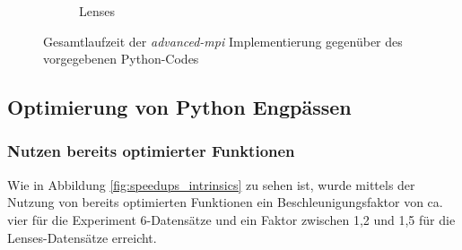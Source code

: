 \begin{center}
\begin{figure}[htbp]
\begin{subfigure}[b]{0.45\textwidth}
			\caption{Lenses}
			\label{fig:mpi_advanced_times_lenses}
		\end{subfigure}
		\caption{Gesamtlaufzeit der \textit{advanced-mpi} Implementierung gegenüber des vorgegebenen Python-Codes}
		\label{fig:mpi_advanced_times}
	\end{figure}
\end{center}

\subsection{Optimierung von Python Engpässen}

\subsubsection{Nutzen bereits optimierter Funktionen}

Wie in Abbildung \ref{fig:speedups_intrinsics} zu sehen ist, wurde mittels der Nutzung von bereits optimierten Funktionen ein Beschleunigungsfaktor von ca. vier für die Experiment 6-Datensätze und ein Faktor zwischen 1,2 und 1,5 für die Lenses-Datensätze erreicht. 


